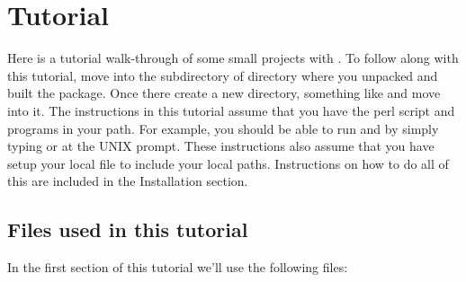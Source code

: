 \section{Tutorial}

Here is a tutorial walk-through of some small projects with
. To follow along with this tutorial, move into the
 subdirectory of  directory
where you unpacked and built the  package. Once there
create a new directory, something like  and move
into it. The instructions in this tutorial assume that you have the
 perl script and  programs in your path. For
example, you should be able to run  and
 by simply typing  or
 at the UNIX prompt.  These instructions also
assume that you have setup your local
 file to include your local
paths. Instructions on how to do all of this are included in the
Installation section.

\subsection{Files used in this tutorial}

In the first section of this tutorial we'll use the following files:

